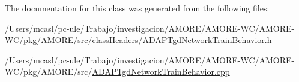The documentation for this class was generated from the following files:\begin{DoxyCompactItemize}
\item 
/Users/mcasl/pc-\/ule/Trabajo/investigacion/AMORE/AMORE-\/WC/AMORE-\/WC/pkg/AMORE/src/classHeaders/\hyperlink{_a_d_a_p_tgd_network_train_behavior_8h}{ADAPTgdNetworkTrainBehavior.h}\item 
/Users/mcasl/pc-\/ule/Trabajo/investigacion/AMORE/AMORE-\/WC/AMORE-\/WC/pkg/AMORE/src/\hyperlink{_a_d_a_p_tgd_network_train_behavior_8cpp}{ADAPTgdNetworkTrainBehavior.cpp}\end{DoxyCompactItemize}
